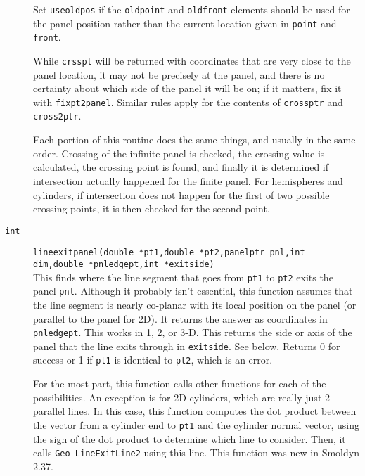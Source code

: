\documentclass {book}
\begin{document}
\begin{description}
Set \texttt{useoldpos} if the \texttt{oldpoint} and \texttt{oldfront} elements should be used for the panel position rather than the current location given in \texttt{point} and \texttt{front}.

While \texttt{crsspt} will be returned with coordinates that are very close to the panel location, it may not be precisely at the panel, and there is no certainty about which side of the panel it will be on; if it matters, fix it with \texttt{fixpt2panel}. Similar rules apply for the contents of \texttt{crossptr} and \texttt{cross2ptr}.

Each portion of this routine does the same things, and usually in the same order. Crossing of the infinite panel is checked, the crossing value is calculated, the crossing point is found, and finally it is determined if intersection actually happened for the finite panel. For hemispheres and cylinders, if intersection does not happen for the first of two possible crossing points, it is then checked for the second point.

\item[\texttt{int}]
\texttt{lineexitpanel(double *pt1,double *pt2,panelptr pnl,int dim,double *pnledgept,int *exitside)}
\hfill \\
This finds where the line segment that goes from \texttt{pt1} to \texttt{pt2} exits the panel \texttt{pnl}. Although it probably isn't essential, this function assumes that the line segment is nearly co-planar with its local position on the panel (or parallel to the panel for 2D). It returns the answer as coordinates in \texttt{pnledgept}. This works in 1, 2, or 3-D. This returns the side or axis of the panel that the line exits through in \texttt{exitside}. See below. Returns 0 for success or 1 if \texttt{pt1} is identical to \texttt{pt2}, which is an error.

For the most part, this function calls other functions for each of the possibilities. An exception is for 2D cylinders, which are really just 2 parallel lines. In this case, this function computes the dot product between the vector from a cylinder end to \texttt{pt1} and the cylinder normal vector, using the sign of the dot product to determine which line to consider. Then, it calls \texttt{Geo\_LineExitLine2} using this line. This function was new in Smoldyn 2.37.


\end{description}
\end{document}
